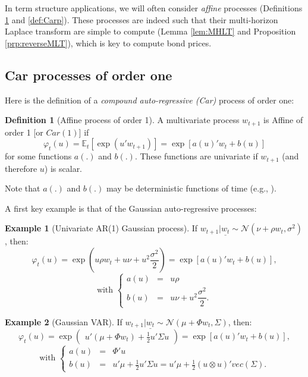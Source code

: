 \documentclass[
  12pt,
]{book}
\theoremstyle{definition}
\newtheorem{definition}{Definition}[chapter]
\theoremstyle{definition}
\newtheorem{example}{Example}[chapter]
\theoremstyle{definition}
\theoremstyle{definition}
\theoremstyle{remark}
\begin{document}
In term structure applications, we will often consider \emph{affine} processes (Definitions \ref{def:Car1} and \ref{def:Carp}). These processes are indeed such that their multi-horizon Laplace transform are simple to compute (Lemma \ref{lem:MHLT} and Proposition \ref{prp:reverseMLT}), which is key to compute bond prices.

\hypertarget{car-processes-of-order-one}{%
\subsection{Car processes of order one}\label{car-processes-of-order-one}}

Here is the definition of a \emph{compound auto-regressive (Car)} process of order one:

\begin{definition}[Affine process of order 1]
\protect\hypertarget{def:Car1}{}\label{def:Car1}A multivariate process \(w_{t+1}\) is Affine of order 1 {[}or \(Car(1)\){]} if
\[
\varphi_t(u)=\mathbb{E}_t[\exp(u'w_{t+1})]=\exp[a(u)'w_t+b(u)]
\]
for some functions \(a(.)\) and \(b(.)\). These functions are univariate if \(w_{t+1}\) (and therefore \(u\)) is scalar.
\end{definition}

Note that \(a(.)\) and \(b(.)\) may be deterministic functions of time (e.g., \citet{Chikhani_Renne_2022}).

A first key example is that of the Gaussian auto-regressive processes:

\begin{example}[Univariate AR(1) Gaussian process]
\protect\hypertarget{exm:GAR1}{}\label{exm:GAR1}If \(w_{t+1}|\underline{w_t} \sim \mathcal{N}(\nu+\rho w_t, \sigma^2)\), then:
\[
\varphi_t(u) = \exp\left(
u \rho w_t + u \nu + u^2  \frac{\sigma^2}{2}
\right) = \exp[a(u)'w_t+b(u)],
\]
\[
\mbox{with }\left\{
\begin{array}{cll}
a(u) &=& u \rho\\
b(u) &=& u \nu + u^2  \dfrac{\sigma^2}{2}.
\end{array}
\right.
\]
\end{example}

\begin{example}[Gaussian VAR]
\protect\hypertarget{exm:GVAR1}{}\label{exm:GVAR1}If \(w_{t+1}|\underline{w_t} \sim \mathcal{N}(\mu+\Phi w_t, \Sigma)\), then:
\[
\varphi_t(u) = \exp\left(
\begin{array}{l}
u' (\mu + \Phi  w_t)  +  \frac{1}{2} u' \Sigma u
\end{array}
\right) = \exp[a(u)'w_t+b(u)],
\]
\[
\mbox{with }\left\{
\begin{array}{ccl}
a(u) &=& \Phi'u\\
b(u) &=& u' \mu +  \frac{1}{2} u' \Sigma u = u' \mu + \frac{1}{2}(u \otimes u)' vec(\Sigma).
\end{array}
\right.
\]
\end{example}
\end{document}

